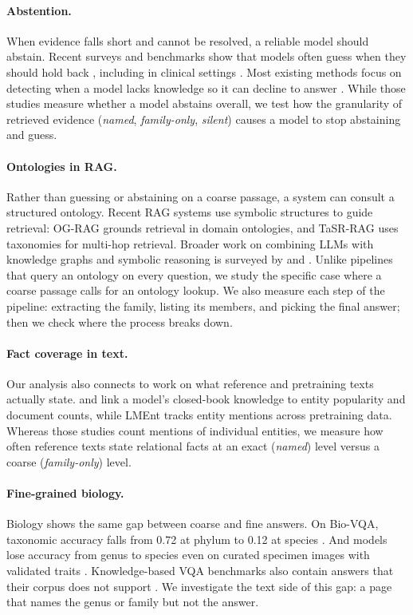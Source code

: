 \paragraph{Abstention.}
When evidence falls short and cannot be resolved, a reliable model should abstain. Recent surveys and benchmarks show that models often guess when they should hold back \citep{wen2025abstention,kirichenko2025abstentionbench}, including in clinical settings \citep{machcha2026abstain}. Most existing methods focus on detecting when a model lacks knowledge so it can decline to answer \citep{kadavath2022know,feng2024abstain}. While those studies measure whether a model abstains overall, we test how the granularity of retrieved evidence (\emph{named}, \emph{family-only}, \emph{silent}) causes a model to stop abstaining and guess.

\paragraph{Ontologies in RAG.}
Rather than guessing or abstaining on a coarse passage, a system can consult a structured ontology. Recent RAG systems use symbolic structures to guide retrieval: OG-RAG \citep{sharma2024ograg} grounds retrieval in domain ontologies, and TaSR-RAG \citep{sun2026tasr} uses taxonomies for multi-hop retrieval. Broader work on combining LLMs with knowledge graphs and symbolic reasoning is surveyed by \citet{pan2024unifying} and \citet{garcez2023third}. Unlike pipelines that query an ontology on every question, we study the specific case where a coarse passage calls for an ontology lookup. We also measure each step of the pipeline: extracting the family, listing its members, and picking the final answer; then we check where the process breaks down.

\paragraph{Fact coverage in text.}
Our analysis also connects to work on what reference and pretraining texts actually state. \citet{mallen2023trust} and \citet{kandpal2023longtail} link a model's closed-book knowledge to entity popularity and document counts, while LMEnt \citep{gottesman2026lment} tracks entity mentions across pretraining data. Whereas those studies count mentions of individual entities, we measure how often reference texts state relational facts at an exact (\emph{named}) level versus a coarse (\emph{family-only}) level.

\paragraph{Fine-grained biology.}
Biology shows the same gap between coarse and fine answers. On Bio-VQA, taxonomic accuracy falls from 0.72 at phylum to 0.12 at species \citep{rayeed2027biovqa}. And models lose accuracy from genus to species \citep{rayeed2025beetleverse} even on curated specimen images with validated traits \citep{rayeed2026beetles}. Knowledge-based VQA benchmarks also contain answers that their corpus does not support \citep{ma2026pitfalls}. We investigate the text side of this gap: a page that names the genus or family but not the answer.
